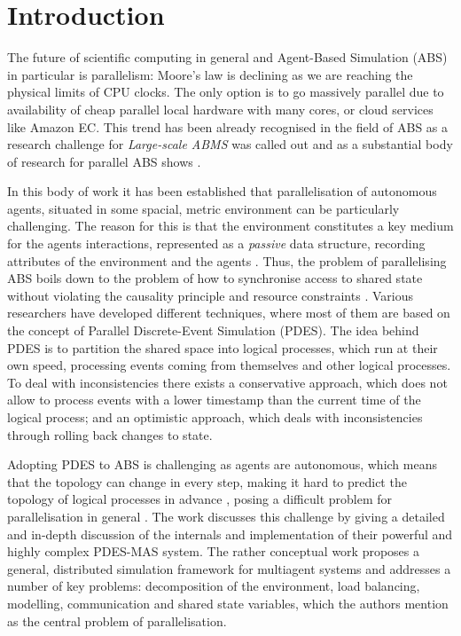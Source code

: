 \section{Introduction} %
The future of scientific computing in general and Agent-Based Simulation (ABS) in particular is parallelism: Moore's law is declining as we are reaching the physical limits of CPU clocks. The only option is to go massively parallel due to availability of cheap parallel local hardware with many cores, or cloud services like Amazon EC. This trend has been already recognised in the field of ABS as a research challenge for \textit{Large-scale ABMS} \cite{macal_everything_2016} was called out and as a substantial body of research for parallel ABS shows \cite{suryanarayanan_pdes-mas_2013, logan_distributed_2001, lees_using_2008, suryanarayanan_synchronised_2013, riley_next_2003, gasser_mace3j:_2002, himmelspach_plugn_2007, minson_distributing_2008, gorur_repast_2016, hay_experiments_2015, abar_agent_2017, cicirelli_efficient_2015}.

In this body of work it has been established that parallelisation of autonomous agents, situated in some spacial, metric environment can be particularly challenging. The reason for this is that the environment constitutes a key medium for the agents interactions, represented as a \textit{passive} data structure, recording attributes of the environment and the agents \cite{lees_using_2008}. Thus, the problem of parallelising ABS boils down to the problem of how to synchronise access to shared state without violating the causality principle and resource constraints \cite{logan_distributed_2001, suryanarayanan_pdes-mas_2013}. Various researchers have developed different techniques, where most of them are based on the concept of Parallel Discrete-Event Simulation (PDES). The idea behind PDES is to partition the shared space into logical processes, which run at their own speed, processing events coming from themselves and other logical processes. To deal with inconsistencies there exists a conservative approach, which does not allow to process events with a lower timestamp than the current time of the logical process; and an optimistic approach, which deals with inconsistencies through rolling back changes to state.

Adopting PDES to ABS is challenging as agents are autonomous, which means that the topology can change in every step, making it hard to predict the topology of logical processes in advance \cite{lees_using_2008}, posing a difficult problem for parallelisation in general \cite{cicirelli_efficient_2015}. The work \cite{suryanarayanan_pdes-mas_2013, suryanarayanan_synchronised_2013} discusses this challenge by giving a detailed and in-depth discussion of the internals and implementation of their powerful and highly complex PDES-MAS system. The rather conceptual work \cite{logan_distributed_2001} proposes a general, distributed simulation framework for multiagent systems and addresses a number of key problems: decomposition of the environment, load balancing, modelling, communication and shared state variables, which the authors mention as the central problem of parallelisation.

